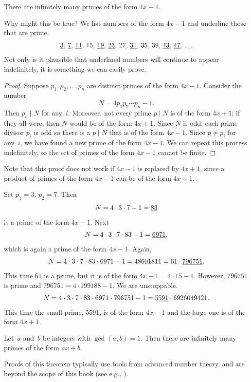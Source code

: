 \begin{proposition}\label{prop:4x-1}
There are infinitely many primes of the form $4x-1$.
\end{proposition}
Why might this be true?   We list numbers of the form $4x-1$ and underline
those that are prime.
$$\underline{3},\, \underline{7},\, \underline{11},\, 15,\, \underline{19},\, \underline{23},\, 27,\, \underline{31},\, 35,\, 39,\,
   \underline{43},\, \underline{47},\, \ldots$$
Not only is it plausible that underlined numbers will continue to appear
indefinitely, it is something we can easily prove.

\begin{proof}
Suppose $p_1, p_2,\ldots, p_n$ are distinct primes of the form $4x-1$.  Consider
the number
$$
      N = 4p_1 p_2  \cdots  p_n - 1.
$$
Then $p_i \nmid N$ for any~$i$.  Moreover, not every prime $p\mid N$
is of the form $4x+1$; if they all were, then $N$ would be of the form
$4x+1$.  Since $N$ is odd, each prime divisor $p_i$ is odd so
there is a $p\mid N$ that is of the form $4x-1$.  Since
$p\not= p_i$ for any~$i$, we have found a new prime of the form
$4x-1$.  We can repeat this process indefinitely, so the set of primes
of the form $4x-1$ cannot be finite.
\end{proof}
Note that this proof does not work if $4x-1$ is replaced by $4x+1$,
since a product of primes of the form $4x-1$ can be of the form
$4x+1$.


\begin{example}\label{ex:inf_prime_form}
Set $p_1=3$, $p_2=7$.   Then
$$
    N = 4\cdot 3 \cdot 7 - 1 = \underline{83}
$$
is a prime of the form $4x-1$.  Next
$$
    N = 4\cdot 3 \cdot 7\cdot 83 - 1 = \underline{6971},
$$
which is again a prime of the form $4x-1$.
Again,
$$
    N = 4\cdot 3 \cdot 7\cdot 83\cdot 6971 - 1 = 48601811 = 61 \cdot \underline{796751}.
$$
This time $61$ is a prime, but it is of the form $4x+1 = 4\cdot 15+1$.
However, $796751$ is prime and
$796751 = 4\cdot 199188 - 1$.
We are unstoppable.
$$
    N = 4\cdot 3 \cdot 7\cdot 83\cdot 6971 \cdot 796751 - 1 = \underline{5591}\cdot 6926049421.
$$
This time the small prime, $5591$, is of the form $4x-1$ and the large
one is of the form $4x+1$.
\end{example}

\begin{theorem}[Dirichlet]\label{thm:dirichlet}
Let~$a$ and~$b$ be integers with $\gcd(a,b)=1$.
Then there are infinitely many primes of the form
$ax+b$.
\end{theorem}
Proofs of this theorem typically use tools from advanced number
theory, and are beyond the scope of this book (see e.g.,
\cite[\S VIII.4]{frohlichtaylor}).




